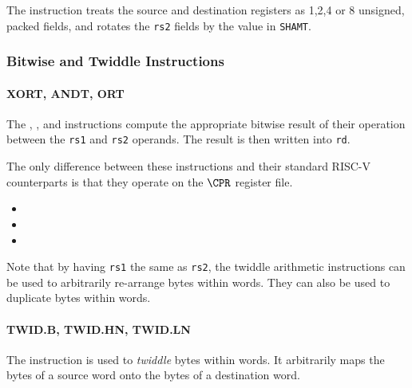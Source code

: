 The instruction  treats the source and destination registers as
1,2,4 or 8 unsigned, packed fields, and rotates the {\tt rs2} fields by
the value in {\tt SHAMT}.

\subsubsection{Bitwise and Twiddle Instructions}

\paragraph{XORT, ANDT, ORT}

The , , and  instructions compute the
appropriate bitwise result of their operation between the {\tt rs1} and
{\tt rs2} operands. The result is then written into {\tt rd}.

The only difference between these instructions and their standard RISC-V
counterparts is that they operate on the $\CPR$ register file.

\begin{itemize}
\item {}
\item {}
\item {}
\end{itemize}

Note that by having {\tt rs1} the same as {\tt rs2}, the twiddle
arithmetic instructions can be used to arbitrarily re-arrange bytes
within words. They can also be used to duplicate bytes within words.

\paragraph{TWID.B, TWID.HN, TWID.LN}

The  instruction is used to {\em twiddle} bytes within words.
It arbitrarily maps the bytes of a source word onto the bytes of a
destination word.

